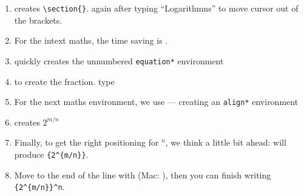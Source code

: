 \begin{enumerate}
    \item {} creates \verb|\section{}|. \keys{\tab} again after typing ``Logarithmns'' to move cursor out of the brackets.
    \item For the intext maths, the time saving is \keys{$\backslash$( + \tab}.
    \item {} quickly creates the unnumbered \texttt{equation*} environment
    \item {} to create the fraction. type 
    \item For the next maths environment, we use  --- creating an \texttt{align*} environment
    \item {} creates \( 2^{m/n} \)
    \item Finally, to get the right positioning for \( ^n \), we think a little bit ahead:  will produce \verb|{2^{m/n}}|.
    \item Move to the end of the line with \keys{\ctrl+\arrowkeyright} (Mac: \keys{\cmd+\arrowkeyright}), then you can finish writing \verb|{2^{m/n}}^n|.
\end{enumerate}

